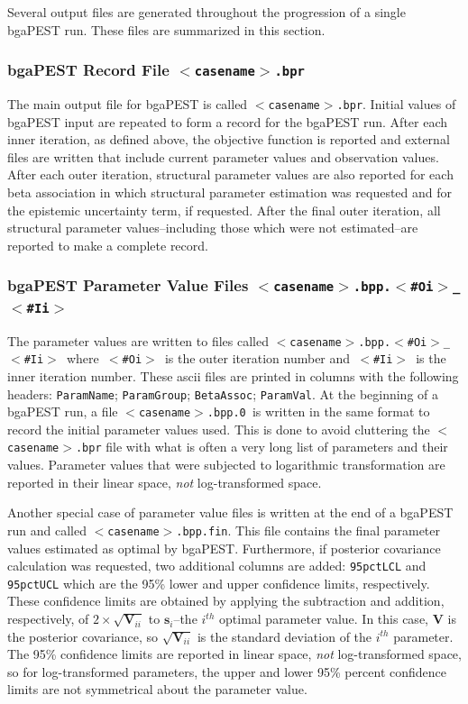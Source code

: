 \documentclass[11pt,oneside,onecolumn]{usgsreport}
\begin{document}
\begin{multicols}{2}
\begin{bibunit}
Several output files are generated throughout the progression of a
single bgaPEST run. These files are summarized in this section.


\subsubsection{bgaPEST Record File \texttt{$<$casename$>$.bpr}}

The main output file for bgaPEST is called \texttt{$<$casename$>$.bpr}.
Initial values of bgaPEST input are repeated to form a record for
the bgaPEST run. After each inner iteration, as defined above, the
objective function is reported and external files are written that
include current parameter values and observation values. After each
outer iteration, structural parameter values are also reported for
each beta association in which structural parameter estimation was
requested and for the epistemic uncertainty term, if requested. After
the final outer iteration, all structural parameter values--including
those which were not estimated--are reported to make a complete record.


\subsubsection{bgaPEST Parameter Value Files \texttt{$<$casename$>$.bpp.$<$\#Oi$>$\_$<$\#Ii$>$}}

The parameter values are written to files called \texttt{$<$casename$>$.bpp.$<$\#Oi$>$\_$<$\#Ii$>$
}where\texttt{ $<$\#Oi$>$ }is the outer iteration number and\texttt{ $<$\#Ii$>$
}is the inner iteration number. These ascii files are printed in columns
with the following headers: \texttt{ParamName}; \texttt{ParamGroup};
\texttt{BetaAssoc}; \texttt{ParamVal}. At the beginning of a bgaPEST
run, a file \texttt{$<$casename$>$.bpp.0 }is written in the same format
to record the initial parameter values used. This is done to avoid
cluttering the \texttt{$<$casename$>$.bpr} file with what is often a very
long list of parameters and their values. Parameter values that were
subjected to logarithmic transformation are reported in their linear
space, \emph{not }log-transformed space.

Another special case of parameter value files is written at the end
of a bgaPEST run and called \texttt{$<$casename$>$.bpp.fin}. This file
contains the final parameter values estimated as optimal by bgaPEST.
Furthermore, if posterior covariance calculation was requested, two
additional columns are added: \texttt{95pctLCL} and \texttt{95pctUCL}
which are the 95\% lower and upper confidence limits, respectively.
These confidence limits are obtained by applying the subtraction and
addition, respectively, of $2\times\sqrt{\mathbf{V}_{ii}}$ to $\mathbf{s}_{i}$--the
$i^{th}$ optimal parameter value. In this case, $\mathbf{V}$ is
the posterior covariance, so $\sqrt{\mathbf{V}_{ii}}$ is the standard
deviation of the $i^{th}$ parameter. The 95\% confidence limits are
reported in linear space, \emph{not} log-transformed space, so for
log-transformed parameters, the upper and lower 95\% percent confidence
limits are not symmetrical about the parameter value. 



\end{bibunit}
\end{multicols}
\end{document}
